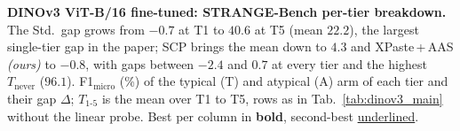 \begin{table}[!htp]%
\centering
\scriptsize
\setlength{\tabcolsep}{2pt}
\caption{\textbf{DINOv3 ViT-B/16 fine-tuned: STRANGE-Bench per-tier breakdown.} The Std.\ gap grows from $-0.7$ at T1 to $40.6$ at T5 (mean $22.2$), the largest single-tier gap in the paper; SCP brings the mean down to $4.3$ and XPaste\,+\,AAS \emph{(ours)} to $-0.8$, with gaps between $-2.4$ and $0.7$ at every tier and the highest $T_{\text{never}}$ ($96.1$). F1$_{\text{micro}}$ (\%) of the typical (T) and atypical (A) arm of each tier and their gap $\Delta$; $T_{1\text{-}5}$ is the mean over T1 to T5, rows as in Tab.~\ref{tab:dinov3_main} without the linear probe. Best per column in \textbf{bold}, second-best \underline{underlined}.}
\label{tab:dinov3_ft_strange}
\resizebox{\linewidth}{!}{%
}
\end{table}
